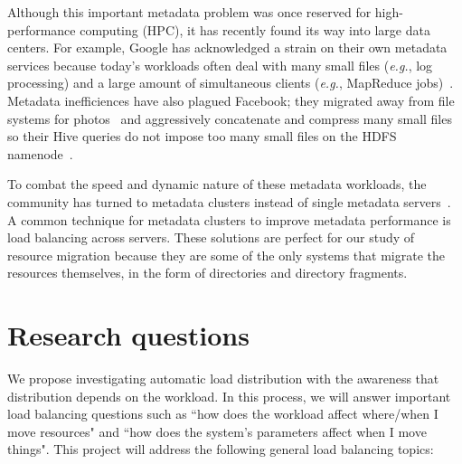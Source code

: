 Although this important metadata problem was once reserved for high-performance computing (HPC), it has recently found its way into large data centers. For example, Google has acknowledged a strain on their own metadata services because today's workloads often deal with many small files ({\it e.g.}, log processing) and a large amount of simultaneous clients ({\it e.g.}, MapReduce jobs)~\cite{mckusick:acm2010-gfs-evolution}. Metadata inefficiences have also plagued Facebook; they migrated away from file systems for photos~\cite{beaver:osdi2010-haystack} and aggressively concatenate and compress many small files so their Hive queries do not impose too many small files on the HDFS namenode~\cite{thusoo:sigmod2010-facebook-infrastructure}. 


To combat the speed and dynamic nature of these metadata workloads, the community has turned to metadata clusters instead of single metadata servers~\cite{patil:fast2011-giga+,weil:osdi2006-ceph,weil:sc2004-dyn-metadata,sinnamohideen:atc2010-ursa,xing:sc2009-skyfs}. A common technique for metadata clusters to improve metadata performance is load balancing across servers. These solutions are perfect for our study of resource migration because they are some of the only systems that migrate the resources themselves, in the form of directories and directory fragments. 


\section{Research questions}
We propose investigating automatic load distribution with the awareness that distribution depends on the workload. In this process, we will answer important load balancing questions such as ``how does the workload affect where/when I move resources" and ``how does the system's parameters affect when I move things". This project will address the following general load balancing topics:

